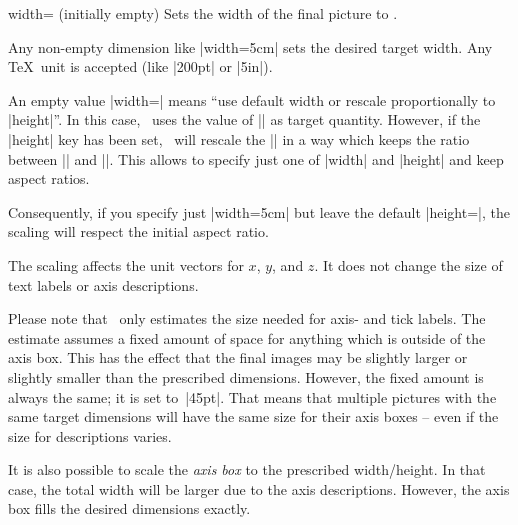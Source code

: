 \begin{pgfplotskey}{width= (initially empty)}
Sets the width of the final picture to . 

Any non-empty dimension like |width=5cm| sets the desired target width. Any \TeX\ unit is accepted (like |200pt| or |5in|).

An empty value |width={}| means ``use default width or rescale proportionally to |height|''. In this case, \PGFPlots\ uses the value of |\axisdefaultwidth| as target quantity. However, if the |height| key has been set, \PGFPlots\ will rescale the |\axisdefaultwidth| in a way which keeps the ratio between |\axisdefaultwidth| and |\axisdefaultheight|. This allows to specify just one of |width| and |height| and keep aspect ratios.

Consequently, if you specify just |width=5cm| but leave the default |height={}|, the scaling will respect the initial aspect ratio.

The scaling affects the unit vectors for $x$, $y$, and $z$. It does not change the size of text labels or axis descriptions.
\begin{codeexample}[]
\end{codeexample}

Please note that \PGFPlots\ only estimates the size needed for axis- and tick labels. The estimate assumes a fixed amount of space for anything which is outside of the axis box. This has the effect that the final images may be slightly larger or slightly smaller than the prescribed dimensions. However, the fixed amount is always the same; it is set to~|45pt|. That means that multiple pictures with the same target dimensions will have the same size for their axis boxes -- even if the size for descriptions varies.

It is also possible to scale the \emph{axis box} to the prescribed width/height. In that case, the total width will be larger due to the axis descriptions. However, the axis box fills the desired dimensions exactly.
\begin{codeexample}[]
\end{codeexample}


\end{pgfplotskey}
